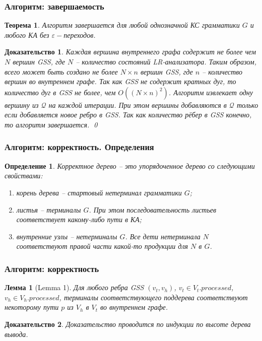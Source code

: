 \documentclass{beamer}
\newtheorem{rutheorem}{Теорема}
\newtheorem{ruproof}{Доказательство}
\newtheorem{rudefinition}{Определение}
\newtheorem{rulemma}{Лемма}
\begin{document}
\begin{frame}
    \transwipe[direction=90]
    \frametitle{Алгоритм: завершаемость}
    \begin{rutheorem}
             Алгоритм завершается для любой однозначной КС грамматики $G$ и любого КА без $\varepsilon-$переходов.
    \end{rutheorem}

    \begin{ruproof}
       Каждая вершина внутреннего графа содержит не более чем $N$ вершин GSS, где $N$ -- количество состояний LR-анализатора. Таким образом, всего может быть создано не более $N\times n$ вершин GSS, где $n$
       -- количество вершин во внутреннем графе. Так как GSS не содержит кратных дуг, то количество дуг в GSS не более, чем $O((N\times n)^2)$. Алгоритм извлекает одну вершину из  $\mathcal Q$ на каждой итерации.
       При этом вершины добавляются в $\mathcal Q$ только если добавляется новое ребро в GSS. Так как количество рёбер в GSS конечно, то алгоритм завершается.
       \qed
    \end{ruproof}

\end{frame}

\begin{frame}
    \transwipe[direction=90]
    \frametitle{Алгоритм: корректность. Определения}
    \begin{rudefinition}
         \emph{Корректное дерево} -- это упорядоченное дерево со следующими свойствами:
        \begin{enumerate}
            \item корень дерева -- стартовый нетерминал грамматики $G$;
            \item листья --  терминалы $G$. При этом последовательность листьев соответствует 
            какому-либо пути в КА;
            \item внутренние узлы -- нетерминалы $G$. Все дети нетерминала $N$ соответствуют правой части какой-то продукции для $N$ в $G$.
        \end{enumerate}
    \end{rudefinition}
\end{frame}

\begin{frame}
    \transwipe[direction=90]
    \frametitle{Алгоритм: корректность}
        \begin{rulemma}[Lemma 1]
    Для любого ребра GSS $(v_{t}, v_{h})$, $v_{t} \in V_{t}.processed$, $v_{h} \in V_{h}.processed$, терминалы соответствующего поддерева соответствуют некоторому пути $p$ из $V_{h}$ в $V_{t}$ во внутреннем графе.
    \end{rulemma}

    \begin{ruproof}
        Доказательство проводится по индукции по высоте дерева вывода.
    \end{ruproof}

\end{frame}
\end{document}

